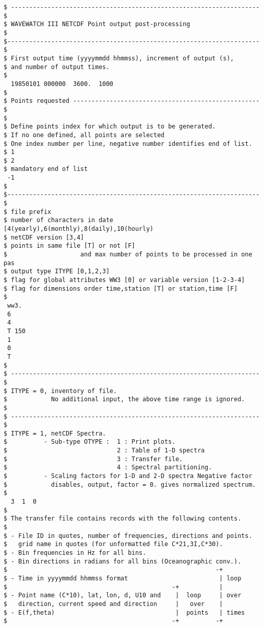 \begin{footnotesize}
\begin{verbatim}
$ -------------------------------------------------------------------- $
$ WAVEWATCH III NETCDF Point output post-processing                    $
$--------------------------------------------------------------------- $
$ First output time (yyyymmdd hhmmss), increment of output (s), 
$ and number of output times.
$
  19850101 000000  3600.  1000
$
$ Points requested --------------------------------------------------- $
$
$ Define points index for which output is to be generated. 
$ If no one defined, all points are selected
$ One index number per line, negative number identifies end of list.
$ 1
$ 2
$ mandatory end of list
 -1
$
$--------------------------------------------------------------------- $
$ file prefix
$ number of characters in date [4(yearly),6(monthly),8(daily),10(hourly)
$ netCDF version [3,4]
$ points in same file [T] or not [F] 
$                    and max number of points to be processed in one pas
$ output type ITYPE [0,1,2,3]
$ flag for global attributes WW3 [0] or variable version [1-2-3-4]
$ flag for dimensions order time,station [T] or station,time [F]
$
 ww3.
 6
 4
 T 150 
 1
 0
 T
$
$ -------------------------------------------------------------------- $
$ ITYPE = 0, inventory of file.
$            No additional input, the above time range is ignored.
$
$ -------------------------------------------------------------------- $
$ ITYPE = 1, netCDF Spectra.
$          - Sub-type OTYPE :  1 : Print plots.
$                              2 : Table of 1-D spectra
$                              3 : Transfer file.
$                              4 : Spectral partitioning.
$          - Scaling factors for 1-D and 2-D spectra Negative factor
$            disables, output, factor = 0. gives normalized spectrum.
$
  3  1  0
$
$ The transfer file contains records with the following contents.
$
$ - File ID in quotes, number of frequencies, directions and points.
$   grid name in quotes (for unformatted file C*21,3I,C*30).
$ - Bin frequencies in Hz for all bins.
$ - Bin directions in radians for all bins (Oceanographic conv.).
$                                                         -+
$ - Time in yyyymmdd hhmmss format                         | loop
$                                             -+           |
$ - Point name (C*10), lat, lon, d, U10 and    |  loop     | over
$   direction, current speed and direction     |   over    |
$ - E(f,theta)                                 |  points   | times
$                                             -+          -+

\end{verbatim}
\end{footnotesize}
